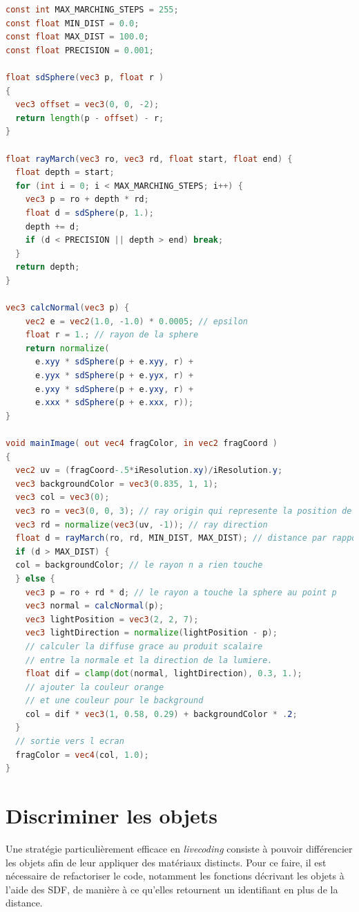 \begin{minipage}{\linewidth}
\begin{lstlisting}[language=GLSL, caption=Code complet,captionpos=b,frame=single]
const int MAX_MARCHING_STEPS = 255;
const float MIN_DIST = 0.0;
const float MAX_DIST = 100.0;
const float PRECISION = 0.001;

float sdSphere(vec3 p, float r )
{
  vec3 offset = vec3(0, 0, -2);
  return length(p - offset) - r;
}

float rayMarch(vec3 ro, vec3 rd, float start, float end) {
  float depth = start;
  for (int i = 0; i < MAX_MARCHING_STEPS; i++) {
    vec3 p = ro + depth * rd;
    float d = sdSphere(p, 1.);
    depth += d;
    if (d < PRECISION || depth > end) break;
  }
  return depth;
}

vec3 calcNormal(vec3 p) {
    vec2 e = vec2(1.0, -1.0) * 0.0005; // epsilon
    float r = 1.; // rayon de la sphere
    return normalize(
      e.xyy * sdSphere(p + e.xyy, r) +
      e.yyx * sdSphere(p + e.yyx, r) +
      e.yxy * sdSphere(p + e.yxy, r) +
      e.xxx * sdSphere(p + e.xxx, r));
}

void mainImage( out vec4 fragColor, in vec2 fragCoord )
{
  vec2 uv = (fragCoord-.5*iResolution.xy)/iResolution.y;
  vec3 backgroundColor = vec3(0.835, 1, 1);
  vec3 col = vec3(0);
  vec3 ro = vec3(0, 0, 3); // ray origin qui represente la position de la camera
  vec3 rd = normalize(vec3(uv, -1)); // ray direction
  float d = rayMarch(ro, rd, MIN_DIST, MAX_DIST); // distance par rapport a la sphere
  if (d > MAX_DIST) {
  col = backgroundColor; // le rayon n a rien touche
  } else {
    vec3 p = ro + rd * d; // le rayon a touche la sphere au point p
    vec3 normal = calcNormal(p);
    vec3 lightPosition = vec3(2, 2, 7);
    vec3 lightDirection = normalize(lightPosition - p);
    // calculer la diffuse grace au produit scalaire
    // entre la normale et la direction de la lumiere.
    float dif = clamp(dot(normal, lightDirection), 0.3, 1.);
    // ajouter la couleur orange
    // et une couleur pour le background
    col = dif * vec3(1, 0.58, 0.29) + backgroundColor * .2;
  }
  // sortie vers l ecran
  fragColor = vec4(col, 1.0);
}

\end{lstlisting}
\end{minipage}


\newpage
\section{Discriminer les objets}
Une stratégie particulièrement efficace en \textit{livecoding} consiste à pouvoir différencier les objets afin de leur appliquer des matériaux distincts. Pour ce faire, il est nécessaire de refactoriser le code, notamment les fonctions décrivant les objets à l'aide des SDF, de manière à ce qu'elles retournent un identifiant en plus de la distance.

